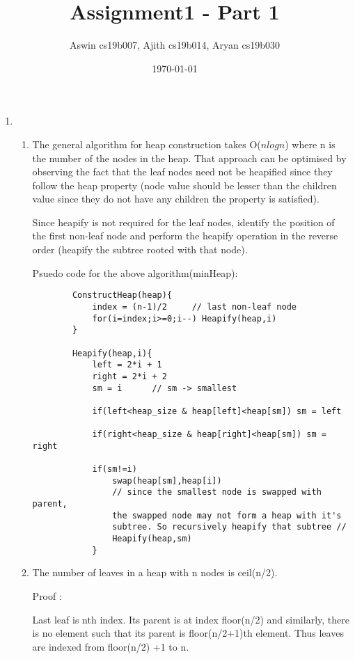 \documentclass[12pt]{article}
\title{Assignment1 - Part 1}
\author{Aswin cs19b007, Ajith cs19b014, Aryan cs19b030}
\date{\today}
\begin{document}
\maketitle

\newpage
\begin{enumerate}
    \item\begin{enumerate}
        \item The general algorithm for heap construction takes O($nlogn$) where n is the number of the nodes in the heap. That approach can be optimised by observing the fact that the leaf nodes need not be  heapified since they follow the heap property (node value should be lesser than the children value since they do not have any children the property is satisfied). 
        
        Since heapify is not required for the leaf nodes, identify the position of the first non-leaf node and perform the heapify operation in the reverse order (heapify the subtree rooted with that node). 
        
        Psuedo code for the above algorithm(minHeap):
        \begin{verbatim}
        ConstructHeap(heap){
            index = (n-1)/2     // last non-leaf node
            for(i=index;i>=0;i--) Heapify(heap,i)
        }
        
        Heapify(heap,i){
            left = 2*i + 1
            right = 2*i + 2
            sm = i      // sm -> smallest
            
            if(left<heap_size & heap[left]<heap[sm]) sm = left 
            
            if(right<heap_size & heap[right]<heap[sm]) sm = right 
            
            if(sm!=i) 
                swap(heap[sm],heap[i])
                // since the smallest node is swapped with parent, 
                the swapped node may not form a heap with it's 
                subtree. So recursively heapify that subtree //
                Heapify(heap,sm) 
            }
        \end{verbatim}    
        \item The number of leaves in a heap with n nodes is ceil(n/2).
        
        Proof : 
        
        Last leaf is nth index. Its parent is at index floor(n/2) and similarly,
        there is no element such that its parent is floor(n/2+1)th element.
        Thus leaves are indexed from floor(n/2) +1 to n.


\end{enumerate}
\end{enumerate}
\end{document}
